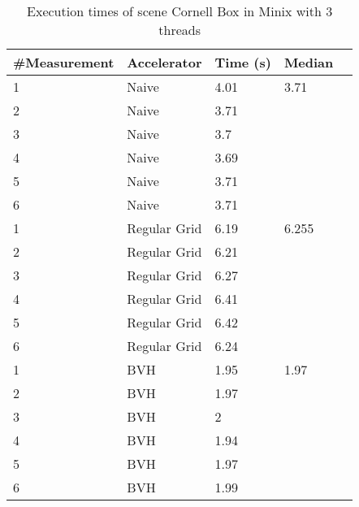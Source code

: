 \begin{table}[H]
	\small
	\begin{tabular}{|l|l|l|l|l|}
		\hline
		\#Measurement & Accelerator & Time (s) & Median \\ \hline
		1 & Naive & 4.01 & 3.71 \\ \hline
		2 & Naive & 3.71 & \\ \hline
		3 & Naive & 3.7 & \\ \hline
		4 & Naive & 3.69 & \\ \hline
		5 & Naive & 3.71 & \\ \hline
		6 & Naive & 3.71 & \\ \hline
		1 & Regular Grid & 6.19 & 6.255 \\ \hline
		2 & Regular Grid & 6.21 & \\ \hline
		3 & Regular Grid & 6.27 & \\ \hline
		4 & Regular Grid & 6.41 & \\ \hline
		5 & Regular Grid & 6.42 & \\ \hline
		6 & Regular Grid & 6.24 & \\ \hline
		1 & BVH & 1.95 & 1.97 \\ \hline
		2 & BVH & 1.97 & \\ \hline
		3 & BVH & 2 & \\ \hline
		4 & BVH & 1.94 & \\ \hline
		5 & BVH & 1.97 & \\ \hline
		6 & BVH & 1.99 & \\ \hline
	\end{tabular}
	\label{Time}
	\caption{Execution times of scene Cornell Box in Minix with 3 threads}
\end{table}

